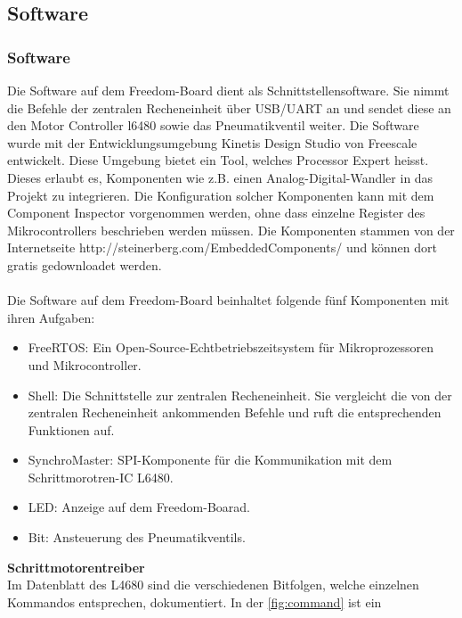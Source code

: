     \subsection{Software}   \label{ch:Software} 
    \fi
    \ifEMBED
    \subsubsection{Software} \label{ch:Software}
    \fi
    Die Software auf dem Freedom-Board dient als Schnittstellensoftware. Sie 
    nimmt die Befehle der zentralen Recheneinheit über USB/UART an und sendet 
    diese an den Motor Controller l6480 sowie das Pneumatikventil weiter. Die 
    Software wurde mit der Entwicklungsumgebung Kinetis Design Studio von 
    Freescale entwickelt. Diese Umgebung bietet ein Tool, welches Processor 
    Expert heisst. Dieses erlaubt es, Komponenten wie z.B. einen 
    Analog-Digital-Wandler in das Projekt zu integrieren. Die Konfiguration 
    solcher Komponenten kann mit dem Component Inspector vorgenommen werden, 
    ohne dass einzelne Register des Mikrocontrollers beschrieben werden 
    müssen. Die Komponenten stammen von der Internetseite 
    http://steinerberg.com/EmbeddedComponents/ und können dort gratis 
    gedownloadet werden.
    \\\\
    Die Software auf dem Freedom-Board beinhaltet folgende fünf Komponenten 
    mit ihren Aufgaben: 
    \begin{itemize}
        \item FreeRTOS:         Ein Open-Source-Echtbetriebszeitsystem für 
            Mikroprozessoren und Mikrocontroller.  
        \item Shell:            Die Schnittstelle zur zentralen Recheneinheit. 
            Sie vergleicht die von der zentralen Recheneinheit ankommenden 
            Befehle und ruft die entsprechenden Funktionen auf. 
        \item SynchroMaster:    SPI-Komponente für die Kommunikation mit dem 
            Schrittmorotren-IC L6480. 
        \item LED:              Anzeige auf dem Freedom-Boarad.
        \item Bit:              Ansteuerung des Pneumatikventils.
    \end{itemize}
    \textbf{Schrittmotorentreiber}\\
    Im Datenblatt des L4680 sind die verschiedenen Bitfolgen, welche einzelnen 
    Kommandos entsprechen, dokumentiert. In der \autoref{fig:command} ist ein 

